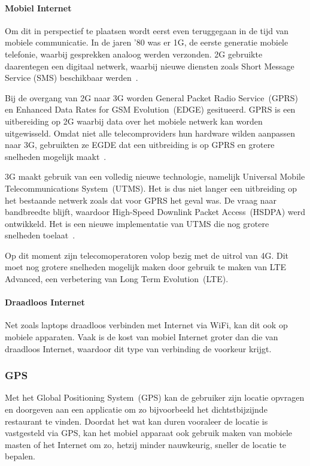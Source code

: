 \paragraph{Mobiel Internet}
Om dit in perspectief te plaatsen wordt eerst even teruggegaan in de tijd van mobiele communicatie.
In de jaren '80 was er 1G, de eerste generatie mobiele telefonie, waarbij gesprekken analoog werden verzonden.
2G gebruikte daarentegen een digitaal netwerk, waarbij nieuwe diensten zoals Short Message Service (SMS) beschikbaar werden~\cite{Miami2008}.

Bij de overgang van 2G naar 3G worden General Packet Radio Service~(GPRS) en Enhanced Data Rates for GSM Evolution~(EDGE) gesitueerd.
GPRS is een uitbereiding op 2G waarbij data over het mobiele netwerk kan worden uitgewisseld.
Omdat niet alle telecomproviders hun hardware wilden aanpassen naar 3G, gebruikten ze EGDE dat een uitbreiding is op GPRS en grotere snelheden mogelijk maakt~\cite{Lauwers2007}.

3G maakt gebruik van een volledig nieuwe technologie, namelijk Universal Mobile Telecommunications System~(UTMS).
Het is dus niet langer een uitbreiding op het bestaande netwerk zoals dat voor GPRS het geval was.
De vraag naar bandbreedte blijft, waardoor High-Speed Downlink Packet Access~(HSDPA) werd ontwikkeld. 
Het is een nieuwe implementatie van UTMS die nog grotere snelheden toelaat~\cite{Lauwers2007}.

Op dit moment zijn telecomoperatoren volop bezig met de uitrol van 4G.
Dit moet nog grotere snelheden mogelijk maken door gebruik te maken van LTE Advanced, een verbetering van Long Term Evolution~(LTE).

\paragraph{Draadloos Internet}
Net zoals laptops draadloos verbinden met Internet via WiFi, kan dit ook op mobiele apparaten.
Vaak is de kost van mobiel Internet groter dan die van draadloos Internet, waardoor dit type van verbinding de voorkeur krijgt.

\subsubsection{GPS}
Met het Global Positioning System~(GPS) kan de gebruiker zijn locatie opvragen en doorgeven aan een applicatie om zo bijvoorbeeld het dichtstbijzijnde restaurant te vinden. 
Doordat het wat kan duren vooraleer de locatie is vastgesteld via GPS, kan het mobiel apparaat ook gebruik maken van mobiele masten of het Internet om zo, hetzij minder nauwkeurig, sneller de locatie te bepalen.

